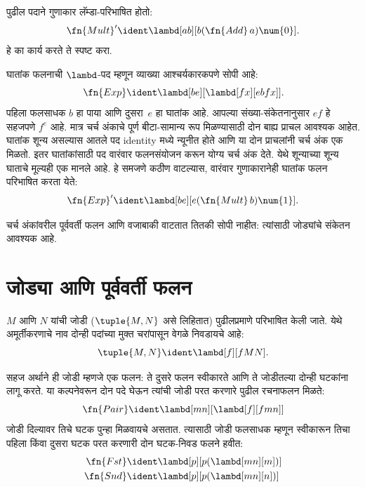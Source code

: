 \begin{prob}
पुढील पदाने गुणाकार लॅम्डा-परिभाषित होतो:
\[  \fn{Mult}' \ident \lambd[ab][b (\fn{Add}\, a) \num{0}].
\]
हे का कार्य करते ते स्पष्ट करा.
\end{prob}


घातांक फलनाची $\lambd$-पद म्हणून व्याख्या
आश्चर्यकारकपणे सोपी आहे:
\[  \fn{Exp} \ident \lambd[be][\lambd[fx][e b f x]].
\]
पहिला फलसाधक $b$ हा पाया आणि दुसरा~$e$ हा
घातांक आहे. आपल्या संख्या-संकेतनानुसार $e f$
हे सहजपणे $f^e$ आहे. मात्र चर्च अंकाचे पूर्ण
बीटा-सामान्य रूप मिळण्यासाठी दोन बाह्य प्राचल आवश्यक
आहेत. घातांक शून्य असल्यास आतले पद identity मध्ये
न्यूनीत होते आणि या दोन प्राचलांनी चर्च अंक एक मिळतो.
इतर घातांकांसाठी पद वारंवार फलनसंयोजन करून योग्य
चर्च अंक देते. येथे शून्याच्या शून्य घाताचे मूल्यही एक
मानले आहे. हे समजणे कठीण वाटल्यास,
वारंवार गुणाकारानेही घातांक फलन परिभाषित करता येते:
\[  \fn{Exp}' \ident \lambd[be][e (\fn{Mult}\, b) \num{1}].
\]

चर्च अंकांवरील पूर्ववर्ती फलन आणि वजाबाकी वाटतात
तितकी सोपी नाहीत: त्यांसाठी जोड्यांचे संकेतन आवश्यक आहे.











\section{जोड्या आणि पूर्ववर्ती फलन}\label{lam:ldf:pai:sec}

\begin{defn}
$M$ आणि $N$ यांची जोडी ($\tuple{M,N}$ असे लिहितात)
पुढीलप्रमाणे परिभाषित केली जाते. येथे अमूर्तीकरणाचे
नाव दोन्ही पदांच्या मुक्त चरांपासून वेगळे निवडायचे आहे:
\[\tuple{M,N} \ident \lambd[f][fMN].
\]
\end{defn}

सहज अर्थाने ही जोडी म्हणजे एक फलन: ते दुसरे फलन
स्वीकारते आणि ते जोडीतल्या दोन्ही घटकांना लागू करते.
या कल्पनेवरून दोन पदे घेऊन त्यांची जोडी परत करणारे
पुढील रचनाफलन मिळते:
\[  \fn{Pair} \ident \lambd[mn][\lambd[f][fmn]]
\]
जोडी दिल्यावर तिचे घटक पुन्हा मिळवायचे असतात.
त्यासाठी जोडी फलसाधक म्हणून स्वीकारून तिचा पहिला
किंवा दुसरा घटक परत करणारी दोन घटक-निवड फलने हवीत:
\begin{align*}
  \fn{Fst} & \ident \lambd[p][p(\lambd[mn][m])]\\
  \fn{Snd} & \ident \lambd[p][p(\lambd[mn][n])]
\end{align*}

